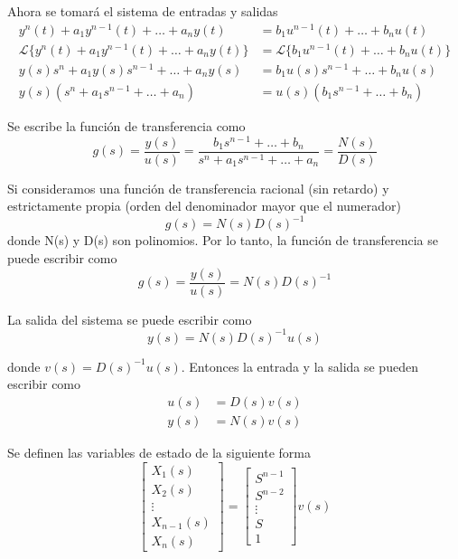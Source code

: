Ahora se tomará el sistema de entradas y salidas
\[
    \begin{split}
        y^{n}(t) + a_{1}y^{n-1}(t) + \ldots + a_{n}y(t) & = b_{1}u^{n-1}(t) + \ldots + b_{n}u(t) \\
        \mathcal{L} \{ y^{n}(t) + a_{1}y^{n-1}(t) + \ldots + a_{n}y(t) \} & = \mathcal{L} \{ b_{1}u^{n-1}(t) + \ldots + b_{n}u(t) \} \\
        y(s)s^{n} + a_{1}y(s)s^{n-1} + \ldots + a_{n}y(s) & = b_{1}u(s)s^{n-1} + \ldots + b_{n}u(s) \\
        y(s) (s^{n} + a_{1}s^{n-1} +\ldots + a_{n} ) & = u(s) (b_{1}s^{n-1} + \ldots + b_{n})
    \end{split}
\]

Se escribe la función de transferencia como 
\[
    g(s) = \frac{y(s)}{u(s)} = \frac{ b_{1}s^{n-1} + \ldots + b_{n} }{ s^{n} + a_{1}s^{n-1} +\ldots + a_{n} } = \frac{N(s)}{D(s)}
\]

Si consideramos una función de transferencia racional (sin retardo) y estrictamente propia (orden del denominador mayor que el numerador)
\[
    g(s)=N(s)D(s)^{-1}
\]
donde N(s) y D(s) son polinomios. Por lo tanto, la función de transferencia se puede escribir como 
\[
    g(s) = \frac{y(s)}{u(s)} = N(s)D(s)^{-1}
\]

La salida del sistema se puede escribir como 
\[
    y(s) = N(s)D(s)^{-1}u(s)
\]

donde \( v(s) = D(s)^{-1}u(s) \). Entonces la entrada y la salida se pueden escribir como 
\[
    \begin{split}
        u(s) & = D(s)v(s) \\
        y(s) & = N(s)v(s)
    \end{split}
\]

Se definen las variables de estado de la siguiente forma
\[ 
    \begin{bmatrix}
        X_{1}(s) \\
        X_{2}(s) \\
        \vdots \\
        X_{n-1}(s) \\
        X_{n}(s)
    \end{bmatrix}
    =
    \begin{bmatrix}
        S^{n-1} \\
        S^{n-2} \\
        \vdots \\
        S \\
        1
    \end{bmatrix} v(s)
\]

